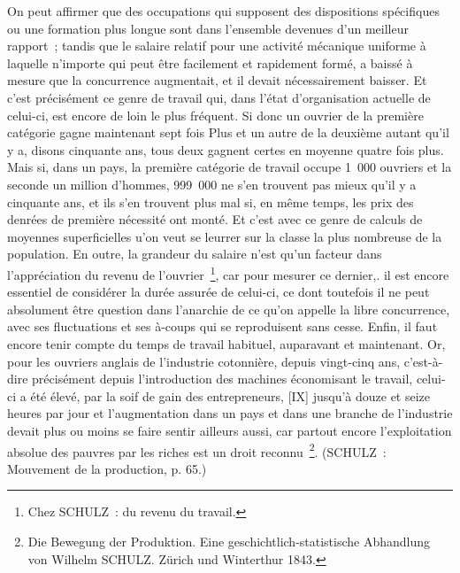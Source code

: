 \documentclass[french,twoside]{book} %
\newenvironment{quoteblock}%
  {\begin{quoting}}
  {\end{quoting}}
\newenvironment{quotebar}{%
    \def\FrameCommand{{\color{rubric!10!}\vrule width 0.5em} \hspace{0.9em}}%
    \def\OuterFrameSep{\itemsep} %
    \MakeFramed {\advance\hsize-\width \FrameRestore}
  }%
  {%
    \endMakeFramed
  }
\renewenvironment{quoteblock}%
  {%
    \savenotes
    \setstretch{0.9}
    \normalfont
    \begin{quotebar}
  }
  {%
    \end{quotebar}
    \spewnotes
  }
\begin{document}
\begin{quoteblock}
 \noindent [VIII] On peut affirmer que des occupations qui supposent des dispositions spécifiques ou une formation plus longue sont dans l’ensemble devenues d’un meilleur rapport ; tandis que le salaire relatif pour une activité mécanique uniforme à laquelle n’importe qui peut être facilement et rapidement formé, a baissé à mesure que la concurrence augmentait, et il devait nécessairement baisser. Et c’est précisément ce genre de travail qui, dans l’état d’organisation actuelle de celui-ci, est encore de loin le plus fréquent. Si donc un ouvrier de la première catégorie gagne maintenant sept fois Plus et un autre de la deuxième autant qu’il y a, disons cinquante ans, tous deux gagnent certes en moyenne quatre fois plus. Mais si, dans un pays, la première catégorie de travail occupe 1 000 ouvriers et la seconde un million d’hommes, 999 000 ne s’en trouvent pas mieux qu’il y a cinquante ans, et ils s’en trouvent plus mal si, en même temps, les prix des denrées de première nécessité ont monté. Et c’est avec ce genre de calculs de moyennes superficielles u'on veut se leurrer sur la classe la plus nombreuse de la population. En outre, la grandeur du salaire n’est qu’un facteur dans l’appréciation du revenu de l’ouvrier \footnote{Chez SCHULZ : du revenu du travail.}, car pour mesurer ce dernier,. il est encore essentiel de considérer la durée assurée de celui-ci, ce dont toutefois il ne peut absolument être question dans l’anarchie de ce qu’on appelle la libre concurrence, avec ses fluctuations et ses à-coups qui se reproduisent sans cesse. Enfin, il faut encore tenir compte du temps de travail habituel, auparavant et maintenant. Or, pour les ouvriers anglais de l’industrie cotonnière, depuis vingt-cinq ans, c’est-à-dire précisément depuis l’introduction des machines économisant le travail, celui-ci a été élevé, par la soif de gain des entrepreneurs, [IX] jusqu’à douze et seize heures par jour et l’augmentation dans un pays et dans une branche de l’industrie devait plus ou moins se faire sentir ailleurs aussi, car partout encore l’exploitation absolue des pauvres par les riches est un droit reconnu \footnote{Die Bewegung der Produktion. Eine geschichtlich-statistische Abhandlung von Wilhelm SCHULZ. Zürich und Winterthur 1843.}. (SCHULZ : Mouvement de la production, p. 65.)\par

\end{quoteblock}
\end{document}
